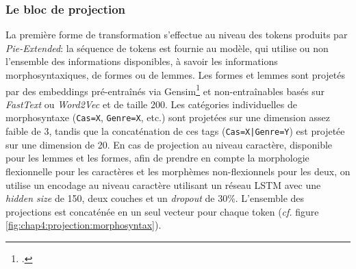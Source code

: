 \subsubsection{Le bloc de projection}

La première forme de transformation s'effectue au niveau des tokens produits par \textit{Pie-Extended}: la séquence de tokens est fournie au modèle, qui utilise ou non l'ensemble des informations disponibles, à savoir les informations morphosyntaxiques, de formes ou de lemmes. Les formes et lemmes sont projetés par des embeddings pré-entraînés via Gensim\footcite{gensim} et non-entraînables basés sur \textit{FastText} ou \textit{Word2Vec} et de taille 200. Les catégories individuelles de morphosyntaxe (\texttt{Cas=X}, \texttt{Genre=X}, etc.) sont projetées sur une dimension assez faible de 3, tandis que la concaténation de ces tags (\texttt{Cas=X|Genre=Y}) est projetée sur une dimension de 20. En cas de projection au niveau caractère, disponible pour les lemmes et les formes, afin de prendre en compte la morphologie flexionnelle pour les caractères et les morphèmes non-flexionnels pour les deux, on utilise un encodage au niveau caractère utilisant un réseau LSTM avec une \textit{hidden size} de 150, deux couches et un \textit{dropout} de 30\%. L'ensemble des projections est concaténée en un seul vecteur pour chaque token (\textit{cf.} figure \ref{fig:chap4:projection:morphosyntax}).

